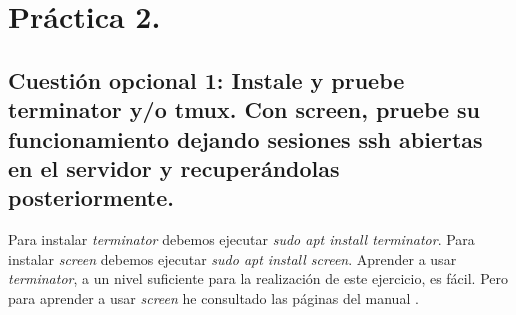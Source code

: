 \documentclass[a4paper,titlepage,12pt]{report}	%
\numberwithin{figure}{section} %
\numberwithin{table}{section} %
\begin{document}
	\chapter[Práctica 2.]{Práctica 2.}

	\section[Cuestión opcional 1: Instale y pruebe terminator y/o tmux. Con screen, pruebe su funcionamiento dejando sesiones ssh abiertas en el servidor y recuperándolas posteriormente.]{Cuestión opcional 1: Instale y pruebe terminator y/o tmux. Con screen, pruebe su funcionamiento dejando sesiones ssh abiertas en el servidor y recuperándolas posteriormente.}

	Para instalar \textit{terminator} debemos ejecutar \textit{sudo apt install terminator}. Para instalar \textit{screen} debemos ejecutar \textit{sudo apt install screen}. Aprender a usar \textit{terminator}, a un nivel suficiente para la realización de este ejercicio, es fácil. Pero para aprender a usar \textit{screen} he consultado las páginas del manual \cite{screen}. \\
\end{document}
